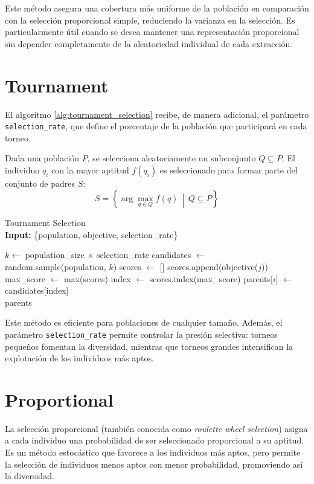 Este método asegura una cobertura más uniforme de la población en comparación con la selección proporcional simple, reduciendo la varianza en la selección. Es particularmente útil cuando se desea mantener una representación proporcional sin depender completamente de la aleatoriedad individual de cada extracción.

\section{Tournament}

El algoritmo \ref{alg:tournament_selection} recibe, de manera adicional, el parámetro \texttt{selection\_rate}, que define el porcentaje de la población que participará en cada torneo.

Dada una población $P$, se selecciona aleatoriamente un subconjunto $Q \subseteq P$. El individuo $q_i$ con la mayor aptitud $f(q_i)$ es seleccionado para formar parte del conjunto de padres $S$:
\[
S = \left\{ \arg\max_{q \in Q} f(q) \,\middle|\, Q \subseteq P \right\}
\]

\begin{algorithm}[H]
	\caption{Tournament Selection \\ \textbf{Input:} \{population, objective, selection\_rate\}}
	\begin{algorithmic}[1]
		\State $k \gets$ population\_size $\times$ selection\_rate
		\State candidates $\gets$ random.sample(population, $k$)
		\State scores $\gets$ []
		\State scores.append(objective($j$))
		\EndFor
		\State max\_score $\gets$ max(scores)
		\State index $\gets$ scores.index(max\_score)
		\State parents[$i$] $\gets$ candidates[index]
		\EndFor \\
		\Return parents
	\end{algorithmic}
	\label{alg:tournament_selection}
\end{algorithm}

Este método es eficiente para poblaciones de cualquier tamaño. Además, el parámetro \texttt{selection\_rate} permite controlar la presión selectiva: torneos pequeños fomentan la diversidad, mientras que torneos grandes intensifican la explotación de los individuos más aptos.

\section{Proportional}

La selección proporcional (también conocida como \textit{roulette wheel selection}) asigna a cada individuo una probabilidad de ser seleccionado proporcional a su aptitud. Es un método estocástico que favorece a los individuos más aptos, pero permite la selección de individuos menos aptos con menor probabilidad, promoviendo así la diversidad.

